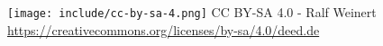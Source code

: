 \texttt{[image: include/cc-by-sa-4.png]}
CC BY-SA 4.0 - Ralf Weinert\newline
\url{https://creativecommons.org/licenses/by-sa/4.0/deed.de}\cite{LIZENZ}